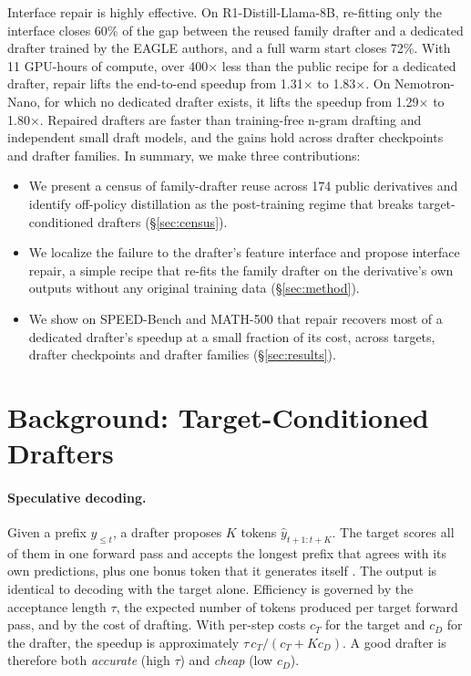 \documentclass[11pt]{article}
\newcommand{\tauacc}{\tau}
\newcommand{\ours}{interface repair}
\newcommand{\Ours}{Interface repair}
\begin{document}
\Ours{} is highly effective.
On R1-Distill-Llama-8B, re-fitting only the interface closes 60\% of the gap between the reused family drafter and a dedicated drafter trained by the EAGLE authors, and a full warm start closes 72\%.
With 11 GPU-hours of compute, over 400$\times$ less than the public recipe for a dedicated drafter, repair lifts the end-to-end speedup from 1.31$\times$ to 1.83$\times$.
On Nemotron-Nano, for which no dedicated drafter exists, it lifts the speedup from 1.29$\times$ to 1.80$\times$.
Repaired drafters are faster than training-free n-gram drafting and independent small draft models, and the gains hold across drafter checkpoints and drafter families.
In summary, we make three contributions:
\begin{itemize}
  \setlength\itemsep{1pt}
  \item We present a census of family-drafter reuse across 174 public derivatives and identify off-policy distillation as the post-training regime that breaks target-conditioned drafters (\S\ref{sec:census}).
  \item We localize the failure to the drafter's feature interface and propose \ours{}, a simple recipe that re-fits the family drafter on the derivative's own outputs without any original training data (\S\ref{sec:method}).
  \item We show on SPEED-Bench and MATH-500 that repair recovers most of a dedicated drafter's speedup at a small fraction of its cost, across targets, drafter checkpoints and drafter families (\S\ref{sec:results}).
\end{itemize}

\section{Background: Target-Conditioned Drafters}
\label{sec:background}

\paragraph{Speculative decoding.}
Given a prefix $y_{\le t}$, a drafter proposes $K$ tokens $\hat y_{t+1:t+K}$.
The target scores all of them in one forward pass and accepts the longest prefix that agrees with its own predictions, plus one bonus token that it generates itself \citep{leviathan2023speculative,chen2023accelerating}.
The output is identical to decoding with the target alone.
Efficiency is governed by the acceptance length $\tauacc$, the expected number of tokens produced per target forward pass, and by the cost of drafting.
With per-step costs $c_T$ for the target and $c_D$ for the drafter, the speedup is approximately $\tauacc \, c_T / (c_T + K c_D)$.
A good drafter is therefore both \emph{accurate} (high $\tauacc$) and \emph{cheap} (low $c_D$).
\end{document}

